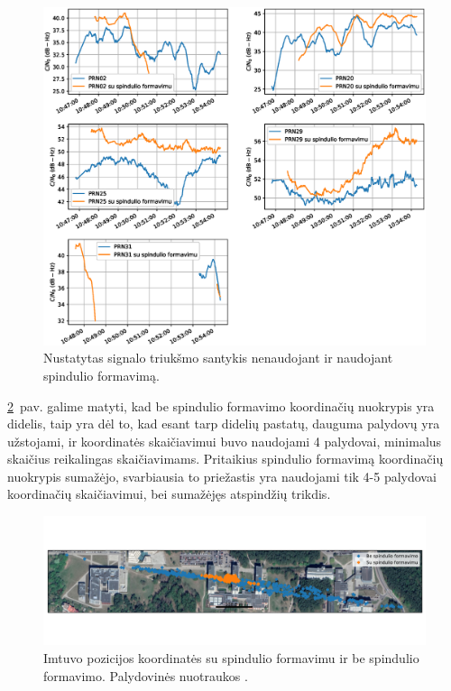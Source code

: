 \documentclass[main.tex]{subfiles}
\begin{document}
\begin{figure}[ht]
    \begin{centering}
    \includegraphics[scale=0.6]{drawings/two_reflections_snr}
    \par\end{centering}
    \protect\caption{\label{fig:two_reflection_snr}Nustatytas signalo triukšmo santykis nenaudojant ir naudojant spindulio formavimą.}
\end{figure}

\ref{fig:two_reflection_map}~pav. galime matyti, kad be spindulio formavimo koordinačių
nuokrypis yra didelis, taip yra dėl to, kad esant tarp didelių pastatų, dauguma palydovų
yra užstojami, ir koordinatės skaičiavimui buvo naudojami 4 palydovai, minimalus
skaičius reikalingas skaičiavimams. Pritaikius spindulio formavimą koordinačių
nuokrypis sumažėjo, svarbiausia to priežastis yra naudojami tik 4-5 palydovai koordinačių
skaičiavimui, bei sumažėjęs atspindžių trikdis.

\begin{figure}[ht]
    \begin{centering}
    \includegraphics[scale=0.5]{drawings/two_reflections_map}
    \par\end{centering}
    \protect\caption{\label{fig:two_reflection_map}Imtuvo pozicijos koordinatės su spindulio formavimu ir be spindulio formavimo. Palydovinės nuotraukos \cite{google_maps}.}
\end{figure}
\end{document}
